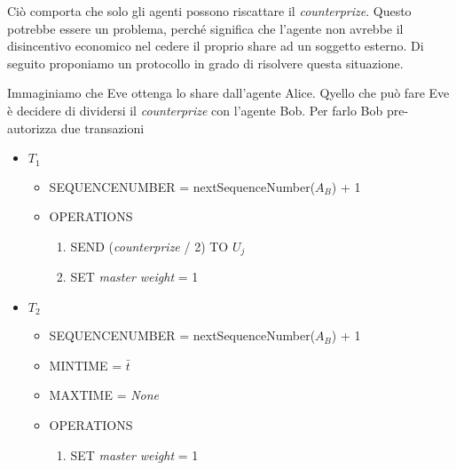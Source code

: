 Ciò comporta che solo gli agenti possono riscattare il \textit{counterprize}. Questo potrebbe
essere un problema, perché significa che l'agente non avrebbe il disincentivo economico
nel cedere il proprio share ad un soggetto esterno. Di seguito proponiamo un protocollo 
in grado di risolvere questa situazione.

Immaginiamo che Eve ottenga lo share dall'agente Alice. 
Qyello che può fare Eve è decidere di dividersi
il \textit{counterprize} con l'agente Bob. Per farlo Bob pre-autorizza due transazioni

\begin{itemize}
	\item $ T_1 $
	      \begin{itemize}
		      \item SEQUENCE\textunderscore NUMBER = nextSequenceNumber($ A_B $) + 1
		      \item OPERATIONS
		            \begin{enumerate}
			            \item SEND (\textit{counterprize} / 2) TO $ U_j $
			            \item SET \textit{master weight} = 1
		            \end{enumerate}
	      \end{itemize}
\end{itemize}
\begin{itemize}
	\item $ T_2 $
	      \begin{itemize}
		      \item SEQUENCE\textunderscore NUMBER = nextSequenceNumber($ A_B $) + 1
		      \item MIN\textunderscore TIME = $ \bar{t} $
		      \item MAX\textunderscore TIME =  \textit{None}
		      \item OPERATIONS
		            \begin{enumerate}
			            \item SET \textit{master weight} = 1
		            \end{enumerate}
	      \end{itemize}
\end{itemize}

